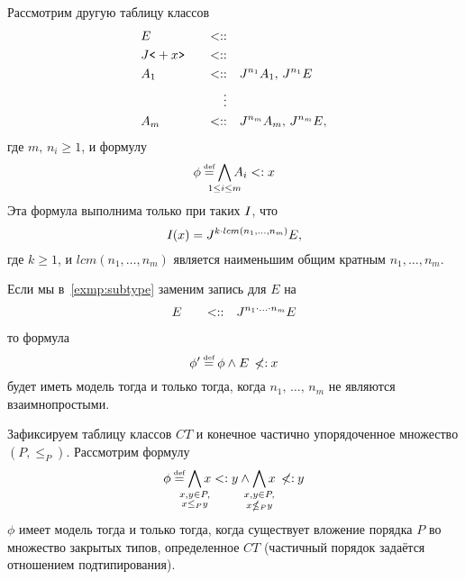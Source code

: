 \begin{exmp}{\label{exmp:subtype}}
Рассмотрим другую таблицу классов
\begin{alignat*}{3}
    &E \quad &<::& \quad  \\
    &J\texttt{<}+{x}\texttt{>} \quad &<::& \quad  \\
    &A_1 \quad &<::& \quad J^{n_1}A_1, \, J^{n_1}E\\
    &&\vdots \\
    &A_m \quad &<::& \quad J^{n_m}A_m, \, J^{n_m}E,
\end{alignat*}
где $m, \, n_i \geq 1$, и формулу
\[
    \phi \eqdef \bigwedge_{\mathclap{1 \leq i \leq m}} A_i \subtype \xtype
\]
Эта формула выполнима только при таких $I_{}$, что
\[
 I_{}({x}) = J^{k\cdot lcm(n_1, \ldots, n_m)}E,
\]
где $k \geq 1$, и $lcm(n_1, \ldots, n_m)$ является наименьшим общим кратным $n_1, \ldots, n_m$.
\end{exmp}

\begin{exmp}\label{exmp:not-coprime}
Если мы в~\autoref{exmp:subtype} заменим запись для $E$ на
\begin{alignat*}{3}
    &E \quad &<::& \quad J^{n_1\cdot \ldots \cdot n_m}E \\
\end{alignat*}
то формула
\[
    \phi' \eqdef \phi \land E \notsubtype \xtype
\]
будет иметь модель тогда и только тогда, когда $n_1, \, \ldots, \, n_m$ не являются взаимнопростыми.
\end{exmp}

\begin{exmp}{\label{exmp:homsubgraph}}
Зафиксируем таблицу классов $CT$ и конечное частично упорядоченное множество $(P, \leq_{P})$. Рассмотрим формулу
\[
    \phi \eqdef \bigwedge_{\mathclap{\substack{\xtype, \ytype \in P,\\ \xtype \leq_{P} \ytype}}} \xtype \subtype \ytype \land \bigwedge_{\mathclap{\substack{\xtype, \ytype \in P,\\ \xtype \nleq_{P} \ytype}}} \xtype \notsubtype \ytype
\]
$\phi$ имеет модель тогда и только тогда, когда существует вложение порядка $P$ во множество закрытых типов, определенное $CT$ (частичный порядок задаётся отношением подтипирования).
\end{exmp}
